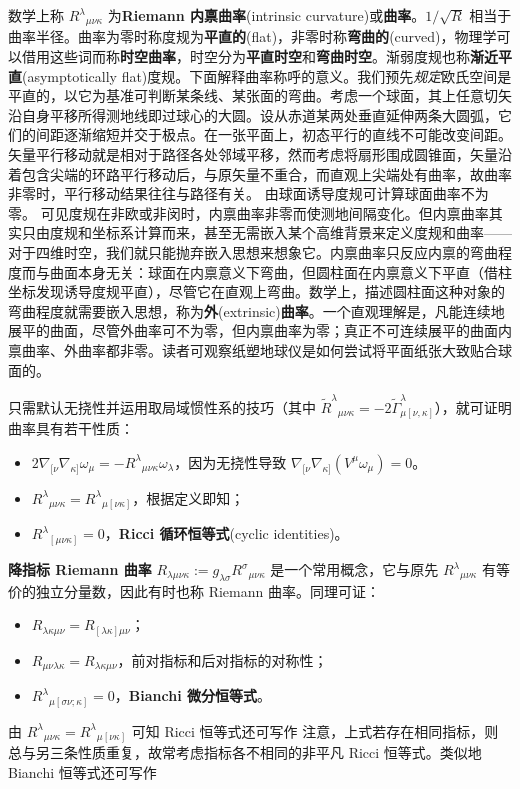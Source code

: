 数学上称 $R^\lambda{}_{\mu\nu\kappa}$ 为\textbf{Riemann 内禀曲率}(intrinsic curvature)或\textbf{曲率}。$1/\sqrt{R}$ 相当于曲率半径。曲率为零时称度规为\textbf{平直的}(flat)，非零时称\textbf{弯曲的}(curved)，物理学可以借用这些词而称\textbf{时空曲率}，时空分为\textbf{平直时空}和\textbf{弯曲时空}。渐弱度规也称\textbf{渐近平直}(asymptotically flat)度规。下面解释曲率称呼的意义。我们预先\textit{规定}欧氏空间是平直的，以它为基准可判断某条线、某张面的弯曲。考虑一个球面，其上任意切矢沿自身平移所得测地线即过球心的大圆。设从赤道某两处垂直延伸两条大圆弧，它们的间距逐渐缩短并交于极点。在一张平面上，初态平行的直线不可能改变间距。矢量平行移动就是相对于路径各处邻域平移，然而考虑将扇形围成圆锥面，矢量沿着包含尖端的环路平行移动后，与原矢量不重合，而直观上尖端处有曲率，故曲率非零时，平行移动结果往往与路径有关。
由球面诱导度规可计算球面曲率不为零。
可见度规在非欧或非闵时，内禀曲率非零而使测地间隔变化。但内禀曲率其实只由度规和坐标系计算而来，甚至无需嵌入某个高维背景来定义度规和曲率——对于四维时空，我们就只能抛弃嵌入思想来想象它。内禀曲率只反应内禀的弯曲程度而与曲面本身无关：球面在内禀意义下弯曲，但圆柱面在内禀意义下平直（借柱坐标发现诱导度规平直），尽管它在直观上弯曲。数学上，描述圆柱面这种对象的弯曲程度就需要嵌入思想，称为\textbf{外}(extrinsic)\textbf{曲率}。一个直观理解是，凡能连续地展平的曲面，尽管外曲率可不为零，但内禀曲率为零；真正不可连续展平的曲面内禀曲率、外曲率都非零。读者可观察纸塑地球仪是如何尝试将平面纸张大致贴合球面的。

只需默认无挠性并运用取局域惯性系的技巧（其中 $\tilde R^\lambda{}_{\mu\nu\kappa}=-2\tilde \Gamma^\lambda_{\mu[\nu,\kappa]}$），就可证明曲率具有若干性质：
\begin{itemize}
    \item $2\nabla_{[\nu}\nabla_{\kappa]} \omega_\mu = - R^\lambda{}_{\mu\nu\kappa} \omega_\lambda$，因为无挠性导致 $\nabla_{[\nu}\nabla_{\kappa]}(V^\mu \omega_\mu)=0$。
    \item ${R^\lambda}_{\mu\nu\kappa}={R^\lambda}_{\mu[\nu\kappa]}$，根据定义即知；
    \item ${R^\lambda}_{[\mu\nu\kappa]}=0$，\textbf{Ricci 循环恒等式}(cyclic identities)。
\end{itemize}
\textbf{降指标 Riemann 曲率} $R_{\lambda\mu\nu\kappa}:=g_{\lambda\sigma}{R^\sigma}_{\mu\nu\kappa}$ 是一个常用概念，它与原先 ${R^\lambda}_{\mu\nu\kappa}$ 有等价的独立分量数，因此有时也称 Riemann 曲率。同理可证：
\begin{itemize}
    \item $R_{\lambda\kappa\mu\nu}=R_{[\lambda\kappa]\mu\nu}$；
    \item $R_{\mu\nu\lambda\kappa}=R_{\lambda\kappa\mu\nu}$，前对指标和后对指标的对称性；
    \item $R^\lambda{}_{ \mu [\sigma\nu ; \kappa]}=0$，\textbf{Bianchi 微分恒等式}。
\end{itemize}
由 ${R^\lambda}_{\mu\nu\kappa}={R^\lambda}_{\mu[\nu\kappa]}$ 可知 Ricci 恒等式还可写作
注意，上式若存在相同指标，则总与另三条性质重复，故常考虑指标各不相同的非平凡 Ricci 恒等式。类似地 Bianchi 恒等式还可写作


